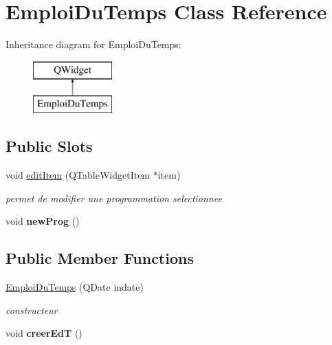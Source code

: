 \hypertarget{class_emploi_du_temps}{}\section{Emploi\+Du\+Temps Class Reference}
\label{class_emploi_du_temps}
Inheritance diagram for Emploi\+Du\+Temps\+:\begin{figure}[H]
\begin{center}
\leavevmode
\includegraphics[height=2.000000cm]{class_emploi_du_temps}
\end{center}
\end{figure}
\subsection*{Public Slots}
\begin{DoxyCompactItemize}
\item 
void \hyperlink{class_emploi_du_temps_afc90a76b699237db2b88f7e018dc86da}{edit\+Item} (Q\+Table\+Widget\+Item $\ast$item)
\begin{DoxyCompactList}\small\item\em permet de modifier une programmation selectionnee \end{DoxyCompactList}\item 
\hypertarget{class_emploi_du_temps_ac42e2e7a838c09f778cfd9d52e5cb9ca}{}void {\bfseries new\+Prog} ()\label{class_emploi_du_temps_ac42e2e7a838c09f778cfd9d52e5cb9ca}

\end{DoxyCompactItemize}
\subsection*{Public Member Functions}
\begin{DoxyCompactItemize}
\item 
\hyperlink{class_emploi_du_temps_a5f21feda2d3eb2d80d20c9501c6bfb80}{Emploi\+Du\+Temps} (Q\+Date indate)
\begin{DoxyCompactList}\small\item\em constructeur \end{DoxyCompactList}\item 
\hypertarget{class_emploi_du_temps_a900cedbc8036cc4c45e4ff8872b23bd3}{}void {\bfseries creer\+Ed\+T} ()\label{class_emploi_du_temps_a900cedbc8036cc4c45e4ff8872b23bd3}

\end{DoxyCompactItemize}


